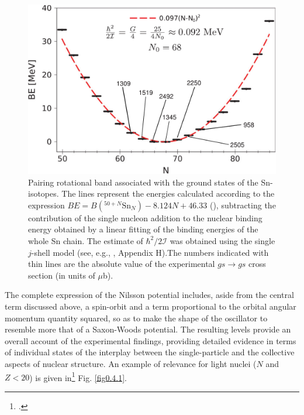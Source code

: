 \begin{figure}
	\centerline {
		\includegraphics*[width=12cm, angle=0.]{introduccion/figs/fig0_4_5_v3}
	}
	\caption{Pairing rotational band associated with the ground states of the Sn-isotopes. The lines represent the energies calculated according to the expression $BE = B( ^{50+N}\text{Sn}_N ) - 8.124N + 46.33$ (\cite{Brink:05}), subtracting the contribution of the single nucleon addition to the nuclear binding		energy obtained by a linear fitting of the binding energies of the whole Sn chain. The estimate of $\hbar^2/2\mathcal I$ was obtained using the single $j$-shell model (see, e.g., \cite{Brink:05}, Appendix H).The numbers indicated with thin lines  are the absolute value of the experimental $gs\to gs$ cross section (in units of $\mu $b).}
	\label{fig0.4.5}
\end{figure}
The complete expression of the Nilsson potential includes, aside from the central term discussed above, a spin-orbit and a term proportional to the orbital angular momentum quantity squared, so as to make the shape of the oscillator to resemble more that of a Saxon-Woods potential. The resulting levels provide an overall account of the experimental findings, providing detailed evidence in terms of individual states of the interplay between the single-particle and the collective aspects of nuclear structure. An example of relevance for light nuclei ($N$ and $Z<20$) is given in\footnote{\cite{Mottelson:59}.} Fig. \ref{fig0.4.1}.

